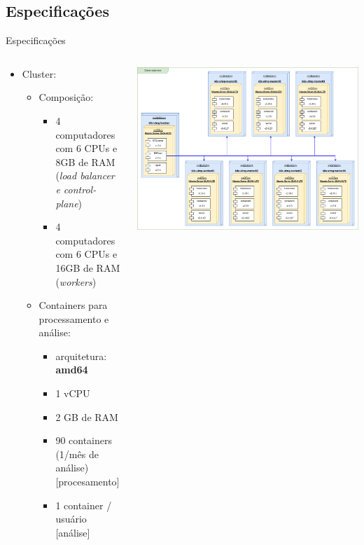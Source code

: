 \documentclass[10pt,brazil]{beamer}
\theoremstyle{definition}
\begin{document}
\subsection{Especificações}

\begin{frame}[allowframebreaks]{Especificações}
  \begin{columns}
    \begin{column}{0.5\textwidth}
      \begin{itemize}
        \item Cluster:
              \begin{itemize}
                \item Composição:
                \begin{itemize}
                    \item 4 computadores com 6 CPUs e 8GB de RAM (\emph{load balancer e control-plane})
                    \item 4 computadores com 6 CPUs e 16GB de RAM (\emph{workers})
                \end{itemize}
              \end{itemize}
        \begin{itemize}
            \item Containers para processamento e análise:
              \begin{itemize}
              \item  arquitetura: \textbf{amd64}
                \item 1 vCPU
                \item 2 GB de RAM
                \item 90 containers (1/mês de análise) [procesamento]
                \item 1 container /  usuário [análise]
              \end{itemize}
        \end{itemize}
    \end{itemize}
    \end{column}
    \begin{column}{0.5\textwidth}  %
      \begin{center}
        \includegraphics[width=1\textwidth]{TCC - Kubenertes-Cluster Deplyment.drawio.png}

\end{center}
\end{column}
\end{columns}
\end{frame}
\end{document}
